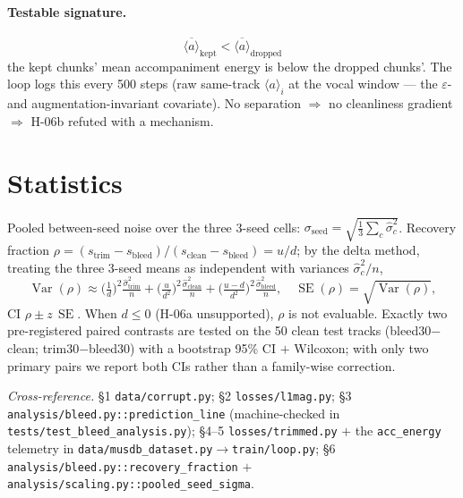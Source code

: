 \documentclass[11pt]{article}
\newcommand{\code}[1]{\texttt{#1}}
\DeclareMathOperator{\Var}{Var}
\DeclareMathOperator{\SE}{SE}
\newcommand{\eps}{\varepsilon}
\newcommand{\keptbar}{\overline{\langle a\rangle}_{\text{kept}}}
\newcommand{\dropbar}{\overline{\langle a\rangle}_{\text{dropped}}}
\begin{document}
\paragraph{Testable signature.}
\begin{equation}
\boxed{\ \keptbar < \dropbar\ }
\end{equation}
the kept chunks' mean accompaniment energy is below the dropped chunks'. The loop logs this
every 500 steps (raw same-track $\langle a\rangle_i$ at the vocal window --- the $\eps$- and
augmentation-invariant covariate). No separation $\Rightarrow$ no cleanliness gradient
$\Rightarrow$ H-06b refuted with a mechanism.

\section{Statistics}

Pooled between-seed noise over the three 3-seed cells:
$\sigma_{\text{seed}}=\sqrt{\tfrac13\sum_c\hat\sigma_c^2}$. Recovery fraction
$\rho=(s_{\text{trim}}-s_{\text{bleed}})/(s_{\text{clean}}-s_{\text{bleed}})=u/d$; by the
delta method, treating the three 3-seed means as independent with variances
$\hat\sigma_c^2/n$,
\begin{equation}
\Var(\rho)\approx\Big(\tfrac1d\Big)^2\tfrac{\hat\sigma_{\text{trim}}^2}{n}
 +\Big(\tfrac{u}{d^2}\Big)^2\tfrac{\hat\sigma_{\text{clean}}^2}{n}
 +\Big(\tfrac{u-d}{d^2}\Big)^2\tfrac{\hat\sigma_{\text{bleed}}^2}{n},\quad
 \SE(\rho)=\sqrt{\Var(\rho)},
\end{equation}
CI $\rho\pm z\,\SE$. When $d\le0$ (H-06a unsupported), $\rho$ is not evaluable. Exactly two
pre-registered paired contrasts are tested on the 50 clean test tracks (bleed30$-$clean;
trim30$-$bleed30) with a bootstrap 95\% CI $+$ Wilcoxon; with only two primary pairs we
report both CIs rather than a family-wise correction.

\bigskip
\noindent\emph{Cross-reference.} \S1 \code{data/corrupt.py}; \S2 \code{losses/l1mag.py};
\S3 \code{analysis/bleed.py::prediction\_line} (machine-checked in
\code{tests/test\_bleed\_analysis.py}); \S4--5 \code{losses/trimmed.py} $+$ the
\code{acc\_energy} telemetry in \code{data/musdb\_dataset.py}$\to$\code{train/loop.py};
\S6 \code{analysis/bleed.py::recovery\_fraction} $+$
\code{analysis/scaling.py::pooled\_seed\_sigma}.
\end{document}
